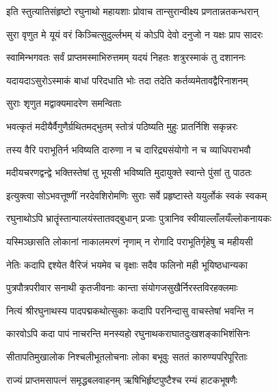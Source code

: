 \twolineshloka
{इति स्तुत्यातिसंहृष्टो रघुनाथो महायशाः}
{प्रोवाच तान्सुरान्वीक्ष्य प्रणतान्नतकन्धरान्}%


\twolineshloka
{सुरा वृणुत मे यूयं वरं किञ्चित्सुदुर्ल्लभम्}
{यं कोऽपि देवो दनुजो न यक्षः प्राप सादरः}%


\twolineshloka
{स्वामिन्भगवतः सर्वं प्राप्तमस्माभिरुत्तमम्}
{यदयं निहतः शत्रुरस्माकं तु दशाननः}%

\twolineshloka
{यदायदाऽसुरोऽस्माकं बाधां परिदधाति भोः}
{तदा तदेति कर्तव्यमेतावद्वैरिनाशनम्}%



\onelineshloka
{सुराः शृणुत मद्वाक्यमादरेण समन्विताः}%

\twolineshloka
{भवत्कृतं मदीयैर्वैगुणैर्ग्रथितमद्भुतम्}
{स्तोत्रं पठिष्यति मुहुः प्रातर्निशि सकृन्नरः}%

\twolineshloka
{तस्य वैरि पराभूतिर्न भविष्यति दारुणा}
{न च दारिद्र्यसंयोगो न च व्याधिपराभवौ}%

\twolineshloka
{मदीयचरणद्वन्द्वे भक्तिस्तेषां तु भूयसी}
{भविष्यति मुदायुक्ते स्वान्ते पुंसां तु पाठतः}%

\twolineshloka
{इत्युक्त्वा सोऽभवत्तूष्णीं नरदेवशिरोमणिः}
{सुराः सर्वे प्रहृष्टास्ते ययुर्लोकं स्वकं स्वकम्}%

\twolineshloka
{रघुनाथोऽपि भ्रातॄंस्तान्पालयंस्तातवद्बुधान्}
{प्रजाः पुत्रानिव स्वीयाल्लाँलयँल्लोकनायकः}%

\twolineshloka
{यस्मिञ्छासति लोकानां नाकालमरणं नृणाम्}
{न रोगादि पराभूतिर्गृहेषु च महीयसी}%

\twolineshloka
{नेतिः कदापि द्दश्येत वैरिजं भयमेव च}
{वृक्षाः सदैव फलिनो मही भूयिष्ठधान्यका}%

\twolineshloka
{पुत्रपौत्रपरीवार सनाथी कृतजीवनाः}
{कान्ता संयोगजसुखैर्निरस्तविरहक्लमाः}%

\twolineshloka
{नित्यं श्रीरघुनाथस्य पादपद्मकथोत्सुकाः}
{कदापि परनिन्दासु वाचस्तेषां भवन्ति न}%

\twolineshloka
{कारवोऽपि कदा पापं नाचरन्ति मनस्यहो}
{रघुनाथकराघातदुःखशङ्काभिशंसिनः}%

\twolineshloka
{सीतापतिमुखालोक निश्चलीभूतलोचनाः}
{लोका बभूवुः सततं कारुण्यपरिपूरिताः}%

\twolineshloka
{राज्यं प्राप्तमसापत्नं समृद्धबलवाहनम्}
{ऋषिभिर्हृष्टपुष्टैश्च रम्यं हाटकभूषणैः}%

